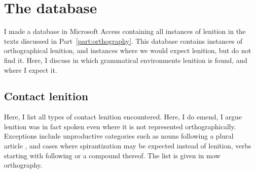 
\chapter{The database}
\label{cha:database}

I made a database in Microsoft Access containing all instances of lenition in the texts discussed in Part~\ref{part:orthography}. This database contains instances of orthographical lenition, and instances where we would expect lenition, but do not find it. Here, I discuss in which grammatical environments lenition is found, and where I expect it.


\section{Contact lenition}
\label{sec:contact-lenition-1}

Here, I list all types of contact lenition encountered. Here, I do emend, \ie I argue lenition was in fact spoken even where it is not represented orthographically. Exceptions include unproductive categories such as nouns following a plural article \eg {}, and cases where spirantization may be expected instead of lenition, \eg verbs starting with  following  or a compound thereof. The list is given in \gls{mow} orthography. 

